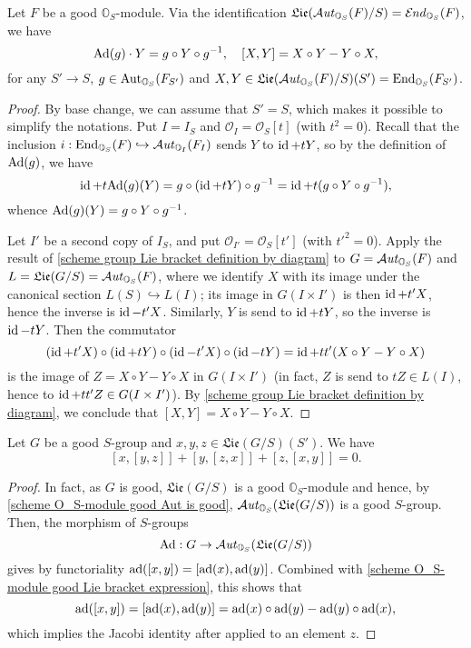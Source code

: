 \begin{proposition}\label{scheme O_S-module good Lie bracket expression}
Let $F$ be a good $\mathbb{O}_S$-module. Via the identification $\mathfrak{Lie}(\operatorname{\mathcal{A}\hspace*{-0.2pt}\textit{ut}\hspace{0.5pt}}_{\mathbb{O}_S}(F)/S)=\operatorname{\mathcal{E}\hspace*{-1pt}\textit{nd}\hspace{0.5pt}}_{\mathbb{O}_S}(F)$, we have
\[\mathrm{Ad}(g)\cdot Y=g\circ Y\circ g^{-1},\quad [X,Y]=X\circ Y-Y\circ X,\]
for any $S'\to S$, $g\in\mathrm{Aut}_{\mathbb{O}_S}(F_{S'})$ and $X,Y\in\mathfrak{Lie}(\operatorname{\mathcal{A}\hspace*{-0.2pt}\textit{ut}\hspace{0.5pt}}_{\mathbb{O}_S}(F)/S)(S')=\mathrm{End}_{\mathbb{O}_S}(F_{S'})$.
\end{proposition}
\begin{proof}
By base change, we can assume that $S'=S$, which makes it possible to simplify the notations. Put $I=I_S$ and $\mathscr{O}_I=\mathscr{O}_S[t]$ (with $t^2=0$). Recall that the inclusion $i:\mathrm{End}_{\mathbb{O}_S}(F)\hookrightarrow\operatorname{\mathcal{A}\hspace*{-0.2pt}\textit{ut}\hspace{0.5pt}}_{\mathbb{O}_I}(F_I)$ sends $Y$ to $\operatorname{id}+tY$, so by the definition of $\mathrm{Ad}(g)$, we have
\[\operatorname{id}+t\mathrm{Ad}(g)(Y)=g\circ(\operatorname{id}+tY)\circ g^{-1}=\operatorname{id}+t(g\circ Y\circ g^{-1}),\]
whence $\mathrm{Ad}(g)(Y)=g\circ Y\circ g^{-1}$.\par
Let $I'$ be a second copy of $I_S$, and put $\mathscr{O}_{I'}=\mathscr{O}_S[t']$ (with $t'^2=0$). Apply the result of \cref{scheme group Lie bracket definition by diagram} to $G=\operatorname{\mathcal{A}\hspace*{-0.2pt}\textit{ut}\hspace{0.5pt}}_{\mathbb{O}_S}(F)$ and $L=\mathfrak{Lie}(G/S)=\operatorname{\mathcal{A}\hspace*{-0.2pt}\textit{ut}\hspace{0.5pt}}_{\mathbb{O}_S}(F)$, where we identify $X$ with its image under the canonical section $L(S)\hookrightarrow L(I)$; its image in $G(I\times I')$ is then $\operatorname{id}+t'X$, hence the inverse is $\operatorname{id}-t'X$. Similarly, $Y$ is send to $\operatorname{id}+tY$, so the inverse is $\operatorname{id}-tY$. Then the commutator
\[(\operatorname{id}+t'X)\circ(\operatorname{id}+tY)\circ(\operatorname{id}-t'X)\circ(\operatorname{id}-tY)=\operatorname{id}+tt'(X\circ Y-Y\circ X)\]
is the image of $Z=X\circ Y-Y\circ X$ in $G(I\times I')$ (in fact, $Z$ is send to $tZ\in L(I)$, hence to $\operatorname{id}+tt'Z\in G(I\times I')$). By \cref{scheme group Lie bracket definition by diagram}, we conclude that $[X,Y]=X\circ Y-Y\circ X$.
\end{proof}

\begin{corollary}\label{scheme O_S-module good Jacobi identity}
Let $G$ be a good $S$-group and $x,y,z\in\mathfrak{Lie}(G/S)(S')$. We have
\[[x,[y,z]]+[y,[z,x]]+[z,[x,y]]=0.\]
\end{corollary}
\begin{proof}
In fact, as $G$ is good, $\mathfrak{Lie}(G/S)$ is a good $\mathbb{O}_S$-module and hence, by \cref{scheme O_S-module good Aut is good}, $\operatorname{\mathcal{A}\hspace*{-0.2pt}\textit{ut}\hspace{0.5pt}}_{\mathbb{O}_S}(\mathfrak{Lie}(G/S))$ is a good $S$-group. Then, the morphism of $S$-groups
\[\mathrm{Ad}:G\to\operatorname{\mathcal{A}\hspace*{-0.2pt}\textit{ut}\hspace{0.5pt}}_{\mathbb{O}_S}(\mathfrak{Lie}(G/S))\]
gives by functoriality $\mathrm{ad}([x,y])=[\mathrm{ad}(x),\mathrm{ad}(y)]$. Combined with \cref{scheme O_S-module good Lie bracket expression}, this shows that
\[\mathrm{ad}([x,y])=[\mathrm{ad}(x),\mathrm{ad}(y)]=\mathrm{ad}(x)\circ\mathrm{ad}(y)-\mathrm{ad}(y)\circ\mathrm{ad}(x),\]
which implies the Jacobi identity after applied to an element $z$.
\end{proof}

